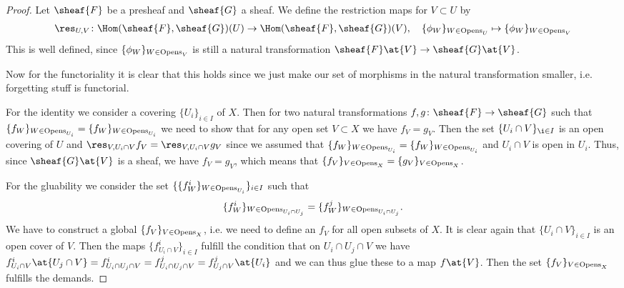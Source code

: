 \begin{proof}
  Let $\sheaf{F}$ be a presheaf and $\sheaf{G}$ a sheaf. We define the
  restriction maps for $V\subset U$ by
  \begin{align*}
    \res_{U,V} \colon \Hom(\sheaf{F} , \sheaf{G} )(U) \rightarrow
    \Hom(\sheaf{F} , \sheaf{G} )(V), \quad \{\phi_W\}_{W\in \Opens_U} \mapsto
    \{\phi_W\}_{W\in \Opens_V}
  \end{align*}
  This is well defined, since $ \{\phi_W\}_{W\in \mathrm{Opens}_V}$ is still a
  natural transformation $\sheaf{F}\at{V}\rightarrow \sheaf{G}\at{V}$.

  Now for the functoriality it is clear that this holds since we just
  make our set of morphisms in the natural transformation smaller,
  i.e. forgetting stuff is functorial.

  For the identity we consider a covering $\{U_i\}_{i\in I}$ of
  $X$. Then for two natural transformations $f,g\colon \sheaf{F}
  \rightarrow \sheaf{G}$ such that $\{f_W\}_{W\in \mathrm{Opens}_{U_i}} =
  \{f_W\}_{W\in \mathrm{Opens}_{U_i}}$ we need to show that for any open set
  $V\subset X$ we have $f_V = g_V$. Then the set $\{U_i\cap V\}_{\i\in
    I}$ is an open covering of $U$ and $\res_{V,U_i\cap V}f_V =
  \res_{V,U_i\cap V}g_V$ since we assumed that $\{f_W\}_{W\in \mathrm{Opens}_{U_i}} =
  \{f_W\}_{W\in \mathrm{Opens}_{U_i}}$ and $U_i\cap V$ is open in $U_i$. Thus, since $\sheaf{G}\at{V}$ is a sheaf,
  we have $f_V = g_V$, which means that $\{f_V\}_{V\in \mathrm{Opens}_X}=
  \{g_V\}_{V\in \mathrm{Opens}_X}$.

  For the gluability we consider the set $\{\{f_W^i\}_{W\in
    \mathrm{Opens}_{U_i}}\}_{i\in I}$ such that
  \begin{align*}
    \{f^i_W\}_{W\in \mathrm{Opens}_{U_i\cap
    U_j}} = \{f^j_W\}_{W\in \mathrm{Opens}_{U_i\cap
    U_j}}.
  \end{align*}
  We have to construct a global
  $\{f_V\}_{V\in \mathrm{Opens}_X}$, i.e. we need to define an $f_V$ for all
  open subsets of $X$. It is clear again that $\{U_i\cap V\}_{i\in I}$
  is an open cover of $V$. Then the maps $\{f^i_{U_i\cap V}\}_{i\in
    I}$ fulfill the condition that on $U_i \cap U_j \cap V$ we have
  $f^i_{U_i\cap V}\at{U_j \cap V} = f^i_{U_i\cap U_j\cap V} =
  f^j_{U_i\cap U_j\cap V} = f^j_{U_j \cap V}\at{U_i}$ and we can thus
  glue these to a map $f\at{V}$. Then the set $\{f_V\}_{V\in
    \mathrm{Opens}_X}$ fulfills the demands.  
\end{proof}

